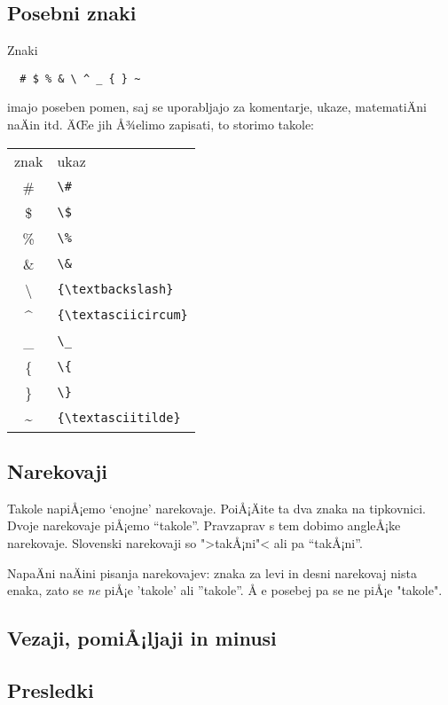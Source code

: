 \documentclass[a4paper]{article}
\begin{document}
\subsection{Posebni znaki}

Znaki
%
\begin{verbatim}
  # $ % & \ ^ _ { } ~
\end{verbatim}
%
imajo poseben pomen, saj se uporabljajo za komentarje, ukaze, matematiÄni naÄin itd. ÄŒe
jih Å¾elimo zapisati, to storimo takole:
%
\begin{center}
\begin{tabular}{cl}
znak & ukaz \\
\# & \verb|\#| \\
\$ & \verb|\$| \\
\% & \verb|\%| \\
\& & \verb|\&| \\
{\textbackslash} & \verb|{\textbackslash}| \\
{\textasciicircum} & \verb|{\textasciicircum}| \\
\_ & \verb|\_| \\
\{ & \verb|\{| \\
\} & \verb|\}| \\
{\textasciitilde} & \verb|{\textasciitilde}| \\
\end{tabular}
\end{center}
\subsection{Narekovaji}

Takole napiÅ¡emo `enojne' narekovaje. PoiÅ¡Äite ta dva znaka na tipkovnici. Dvoje narekovaje
piÅ¡emo ``takole''. Pravzaprav s tem dobimo angleÅ¡ke narekovaje. Slovenski narekovaji so
">takÅ¡ni"< ali pa "`takÅ¡ni"'.

NapaÄni naÄini pisanja narekovajev: znaka za levi in desni narekovaj nista enaka, zato se
\emph{ne} piÅ¡e 'takole' ali ''takole''. Å e posebej pa se ne piÅ¡e "takole".

\subsection{Vezaji, pomiÅ¡ljaji in minusi}
\label{sec:vezaji-pomilj-minusi}


\subsection{Presledki}
\end{document}
